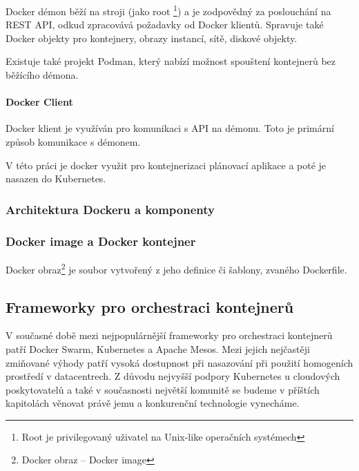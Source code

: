 \documentclass[thesis=M,czech]{FITthesis}[2019/12/23]
\theoremstyle{plain}
\theoremstyle{definition}
\begin{document}
Docker démon běží na stroji (jako root \footnote{Root je privilegovaný uživatel na Unix-like operačních systémech}) a je zodpovědný za poslouchání na REST API, odkud zpracovává požadavky od Docker klientů. Spravuje také Docker objekty pro kontejnery, obrazy instancí, sítě, diskové objekty.


Existuje také projekt Podman, který nabízí možnost spouštení kontejnerů bez běžícího démona. 

\paragraph{Docker Client}

Docker klient je využíván pro komunikaci s API na démonu. Toto je primární způsob komunikace s démonem.


V této práci je docker využit pro kontejnerizaci plánovací aplikace a poté je nasazen do Kubernetes.




\subsubsection{Architektura Dockeru a komponenty}


\subsubsection{Docker image a Docker kontejner}


Docker obraz\footnote{Docker obraz -- Docker image} je soubor vytvořený z jeho definice či šablony, zvaného Dockerfile.  

\subsection{Frameworky pro orchestraci kontejnerů}


V současné době mezi nejpopulárnější frameworky pro orchestraci kontejnerů patří Docker Swarm, Kubernetes a Apache Mesos. Mezi jejich nejčastěji zmiňované výhody patří vysoká dostupnost při nasazování při použití homogeních prostředí v datacentrech. Z důvodu nejvyšší podpory Kubernetes u cloudových poskytovatelů a také v současnosti největší komunitě se budeme v příštích kapitolách věnovat právě jemu a konkurenční technologie vynecháme.
\end{document}
